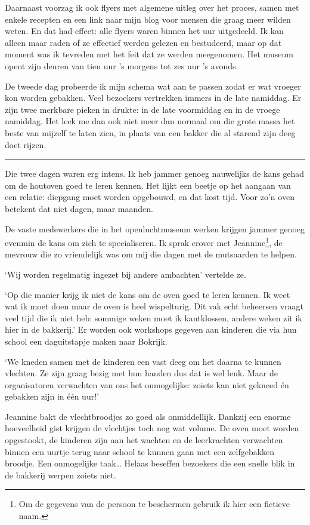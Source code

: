 \documentclass[
  11pt,
  dutch,
]{memoir}
\begin{document}
Daarnaast voorzag ik ook flyers met algemene uitleg over het proces,
samen met enkele recepten en een link naar mijn blog voor mensen die
graag meer wilden weten. En dat had effect: alle flyers waren binnen het
uur uitgedeeld. Ik kan alleen maar raden of ze effectief werden gelezen
en bestudeerd, maar op dat moment was ik tevreden met het feit dat ze
werden meegenomen. Het museum opent zijn deuren van tien uur 's morgens
tot zes uur 's avonds.

De tweede dag probeerde ik mijn schema wat aan te passen zodat er wat
vroeger kon worden gebakken. Veel bezoekers vertrekken immers in de late
namiddag. Er zijn twee merkbare pieken in drukte: in de late voormiddag
en in de vroege namiddag. Het leek me dan ook niet meer dan normaal om
die grote massa het beste van mijzelf te laten zien, in plaats van een
bakker die al starend zijn deeg doet rijzen.

\pfbreak

Die twee dagen waren erg intens. Ik heb jammer genoeg nauwelijks de kans
gehad om de houtoven goed te leren kennen. Het lijkt een beetje op het
aangaan van een relatie: diepgang moet worden opgebouwd, en dat kost
tijd. Voor zo'n oven betekent dat niet dagen, maar maanden.

De vaste medewerkers die in het openluchtmuseum werken krijgen jammer
genoeg evenmin de kans om zich te specialiseren. Ik sprak erover met
Jeannine\footnote{Om de gegevens van de persoon te beschermen gebruik ik
  hier een fictieve naam.}, de mevrouw die zo vriendelijk was om mij die
dagen met de mutsaarden te helpen.

`Wij worden regelmatig ingezet bij andere ambachten' vertelde ze.

`Op die manier krijg ik niet de kans om de oven goed te leren kennen. Ik
weet wat ik moet doen maar de oven is heel wispelturig. Dit vak echt
beheersen vraagt veel tijd die ik niet heb: sommige weken moet ik
kantklossen, andere weken zit ik hier in de bakkerij.' Er worden ook
workshops gegeven aan kinderen die via hun school een daguitstapje maken
naar Bokrijk.

`We kneden samen met de kinderen een vast deeg om het daarna te kunnen
vlechten. Ze zijn graag bezig met hun handen dus dat is wel leuk. Maar
de organisatoren verwachten van ons het onmogelijke: zoiets kan niet
gekneed én gebakken zijn in één uur!'

Jeannine bakt de vlechtbroodjes zo goed als onmiddellijk. Dankzij een
enorme hoeveelheid gist krijgen de vlechtjes toch nog wat volume. De
oven moet worden opgestookt, de kinderen zijn aan het wachten en de
leerkrachten verwachten binnen een uurtje terug naar school te kunnen
gaan met een zelfgebakken broodje. Een onmogelijke taak\ldots{} Helaas
beseffen bezoekers die een snelle blik in de bakkerij werpen zoiets
niet.
\end{document}
